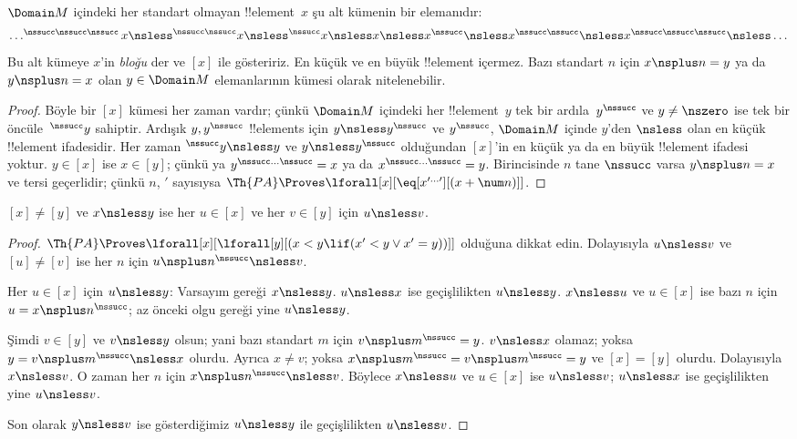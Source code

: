 \begin{prop}
$\Domain M$ içindeki her standart olmayan !!{element}~$x$ şu alt
kümenin bir elemanıdır:
\[
\dots ^{\nssucc\nssucc\nssucc}x \nsless ^{\nssucc\nssucc}x \nsless
^{\nssucc}x \nsless x \nsless x^{\nssucc} \nsless x^{\nssucc\nssucc}
\nsless x^{\nssucc\nssucc\nssucc} \nsless \dots
\]
Bu alt kümeye $x$'in \emph{bloğu} der ve $[x]$ ile gösteririz. En küçük
ve en büyük !!{element} içermez. Bazı standart $n$ için
$x\nsplus n=y$ ya da $y\nsplus n=x$ olan $y\in\Domain M$
elemanlarının kümesi olarak nitelenebilir.
\end{prop}

\begin{proof}
Böyle bir $[x]$ kümesi her zaman vardır; çünkü $\Domain M$ içindeki
her !!{element}~$y$ tek bir ardıla~$y^\nssucc$ ve $y\neq\nszero$ ise
tek bir öncüle~$^\nssucc y$ sahiptir. Ardışık $y,y^\nssucc$
!!{element}s için $y\nsless y^\nssucc$ ve $y^\nssucc$, $\Domain M$
içinde $y$'den $\nsless$ olan en küçük !!{element} ifadesidir.
Her zaman $^\nssucc y\nsless y$ ve $y\nsless y^\nssucc$ olduğundan
$[x]$'in en küçük ya da en büyük !!{element} ifadesi yoktur.
$y\in[x]$ ise $x\in[y]$; çünkü ya
$y^{\nssucc\dots\nssucc}=x$ ya da
$x^{\nssucc\dots\nssucc}=y$. Birincisinde $n$ tane $\nssucc$ varsa
$y\nsplus n=x$ ve tersi geçerlidir; çünkü $n$, $\prime$ sayısıysa
$\Th{PA}\Proves\lforall[x][\eq[x^{\prime\dots\prime}][(x+\num n)]]$.
\end{proof}

\begin{prop}
$[x]\neq[y]$ ve $x\nsless y$ ise her $u\in[x]$ ve her $v\in[y]$ için
$u\nsless v$.
\end{prop}

\begin{proof}
$\Th{PA}\Proves\lforall[x][\lforall[y][(x<y\lif(x'<y\lor x'=y))]]$
olduğuna dikkat edin. Dolayısıyla $u\nsless v$ ve $[u]\neq[v]$ ise
her $n$ için $u\nsplus n^\nssucc\nsless v$.

Her $u\in[x]$ için $u\nsless y$: Varsayım gereği $x\nsless y$.
$u\nsless x$ ise geçişlilikten $u\nsless y$. $x\nsless u$ ve
$u\in[x]$ ise bazı $n$ için $u=x\nsplus n^\nssucc$; az önceki olgu
gereği yine $u\nsless y$.

Şimdi $v\in[y]$ ve $v\nsless y$ olsun; yani bazı standart $m$ için
$v\nsplus m^\nssucc=y$. $v\nsless x$ olamaz; yoksa
$y=v\nsplus m^\nssucc\nsless x$ olurdu. Ayrıca $x\neq v$; yoksa
$x\nsplus m^\nssucc=v\nsplus m^\nssucc=y$ ve $[x]=[y]$ olurdu.
Dolayısıyla $x\nsless v$. O zaman her $n$ için
$x\nsplus n^\nssucc\nsless v$. Böylece $x\nsless u$ ve $u\in[x]$
ise $u\nsless v$; $u\nsless x$ ise geçişlilikten yine $u\nsless v$.

Son olarak $y\nsless v$ ise gösterdiğimiz $u\nsless y$ ile
geçişlilikten $u\nsless v$.
\end{proof}

